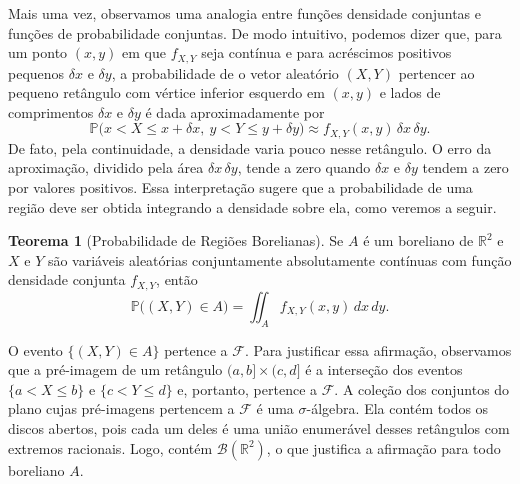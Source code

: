 \documentclass[12pt,portuguese]{article}
\theoremstyle{definition}
\newtheorem{theorem}{Teorema}
\theoremstyle{plainexercise}
\theoremstyle{starredexercise}
\theoremstyle{definition}
\begin{document}
Mais uma vez, observamos uma analogia entre funções densidade conjuntas e
funções de probabilidade conjuntas. De modo intuitivo, podemos dizer que, para
um ponto $(x, y)$ em que $f_{X,Y}$ seja contínua e para acréscimos positivos
pequenos $\delta x$ e $\delta y$, a probabilidade de o vetor aleatório $(X, Y)$
pertencer ao pequeno retângulo com vértice inferior esquerdo em $(x, y)$ e
lados de comprimentos $\delta x$ e $\delta y$ é dada aproximadamente por
\begin{equation}\label{eq:prob-retangulo-infinitesimal}
  \mathbb{P}\bigl(x < X \leqslant x + \delta x,\  y < Y \leqslant y + \delta y\bigr)
  \approx f_{X,Y}(x, y)\,\delta x\,\delta y.
\end{equation}
De fato, pela continuidade, a densidade varia pouco nesse retângulo.
O erro da aproximação, dividido pela área $\delta x\,\delta y$, tende a zero
quando $\delta x$ e $\delta y$ tendem a zero por valores positivos.
Essa interpretação sugere que a probabilidade de uma região deve ser obtida
integrando a densidade sobre ela, como veremos a seguir.

\begin{theorem}[Probabilidade de Regiões Borelianas]\label{thm:probabilidade-subconjuntos-regulares}
  Se $A$ é um boreliano de $\mathbb{R}^2$ e $X$ e $Y$ são
  variáveis aleatórias conjuntamente absolutamente contínuas com função
  densidade conjunta $f_{X,Y}$, então
  \begin{equation}\label{eq:probabilidade-conjunta-regiao}
    \mathbb{P}\bigl((X, Y) \in A\bigr) = \iint_A f_{X,Y}(x, y)\,dx\,dy.
  \end{equation}
\end{theorem}
O evento $\{(X, Y) \in A\}$ pertence a $\mathcal{F}$. Para justificar
essa afirmação, observamos que a pré-imagem de um retângulo
$(a,b]\times(c,d]$ é a interseção dos eventos
$\{a < X \leqslant b\}$ e $\{c < Y \leqslant d\}$ e, portanto, pertence
a $\mathcal{F}$. A coleção dos conjuntos do plano cujas pré-imagens
pertencem a $\mathcal{F}$ é uma $\sigma$-álgebra. Ela contém todos os
discos abertos, pois cada um deles é uma união enumerável desses
retângulos com extremos racionais. Logo, contém
$\mathscr{B}(\mathbb{R}^2)$, o que justifica a afirmação para todo boreliano $A$.
\end{document}
